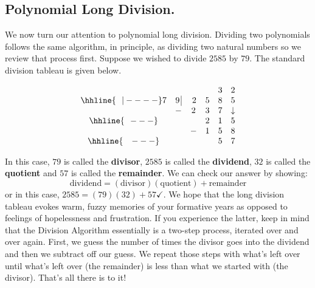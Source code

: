 \subsection{Polynomial Long Division.}
\label{polylongdiv}

We now turn our attention to polynomial long division.  Dividing two polynomials follows the same algorithm, in principle, as dividing two natural numbers so we review that process first.  Suppose we wished to divide $2585$ by $79$.  The standard division tableau is given below. 

\setlength\arraycolsep{0.1pt}
\setlength\extrarowheight{2pt}

\[ \begin{array}{cccccc}

    &             &      &    & 3   & 2  \\ \hhline{~~|----}

  7 & 9 \, \vline & \, 2 & 5 & 8 & 5  \\

    &            -&    2 & 3 & 7 & \downarrow \\ \hhline{~~---} 
    &             &      & 2 & 1 &  5   \\ 
    &             &     - & 1 & 5 & 8    \\ \hhline{~~~---} 
    &             &      &   & 5 & 7    \\

 
\end{array}\]

\setlength\arraycolsep{5pt}
\setlength\extrarowheight{0pt}

In this case, $79$ is called the \textbf{divisor}, $2585$ is called the \textbf{dividend}, $32$ is called the \textbf{quotient} and $57$ is called the \textbf{remainder}.  We can check our answer by showing:  \[ \text{dividend} = (\text{divisor})( \text{quotient}) + \text{remainder}\] or in this case, $2585 = 
 (79)(32) + 57 \checkmark$.  We hope that the long division tableau evokes warm, fuzzy memories of your formative years as opposed to feelings of hopelessness and frustration.  If you experience the latter, keep in mind that the Division Algorithm essentially is a two-step process, iterated over and over again.  First, we guess the number of times the divisor goes into the dividend and  then we subtract off our guess.  We repeat those steps with what's left over until what's left over (the remainder) is less than what we started with (the divisor).  That's all there is to it!

